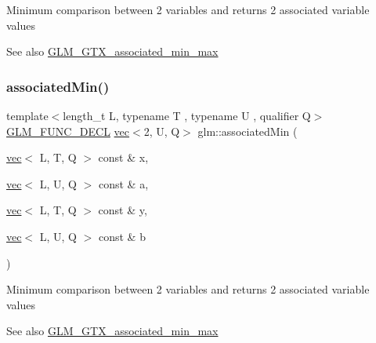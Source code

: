 Minimum comparison between 2 variables and returns 2 associated variable values \begin{DoxySeeAlso}{See also}
\hyperlink{group__gtx__associated__min__max}{G\+L\+M\+\_\+\+G\+T\+X\+\_\+associated\+\_\+min\+\_\+max} 
\end{DoxySeeAlso}
\mbox{\label{group__gtx__associated__min__max_gac2f0dff90948f2e44386a5eafd941d1c}} 
\subsubsection{\texorpdfstring{associated\+Min()}{associatedMin()}\hspace{0.1cm}{\footnotesize\ttfamily [2/10]}}
{\footnotesize\ttfamily template$<$length\+\_\+t L, typename T , typename U , qualifier Q$>$ \\
\hyperlink{setup_8hpp_ab2d052de21a70539923e9bcbf6e83a51}{G\+L\+M\+\_\+\+F\+U\+N\+C\+\_\+\+D\+E\+CL} \hyperlink{structglm_1_1vec}{vec}$<$2, U, Q$>$ glm\+::associated\+Min (\begin{DoxyParamCaption}\item[{\hyperlink{structglm_1_1vec}{vec}$<$ L, T, Q $>$ const \&}]{x,  }\item[{\hyperlink{structglm_1_1vec}{vec}$<$ L, U, Q $>$ const \&}]{a,  }\item[{\hyperlink{structglm_1_1vec}{vec}$<$ L, T, Q $>$ const \&}]{y,  }\item[{\hyperlink{structglm_1_1vec}{vec}$<$ L, U, Q $>$ const \&}]{b }\end{DoxyParamCaption})}

Minimum comparison between 2 variables and returns 2 associated variable values \begin{DoxySeeAlso}{See also}
\hyperlink{group__gtx__associated__min__max}{G\+L\+M\+\_\+\+G\+T\+X\+\_\+associated\+\_\+min\+\_\+max} 
\end{DoxySeeAlso}
\mbox{\label{group__gtx__associated__min__max_gacfec519c820331d023ef53a511749319}} 

